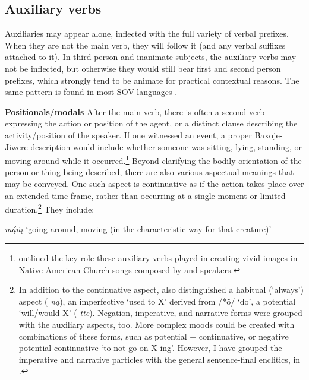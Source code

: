 \documentclass[output=paper]{LSP/langsci}
\begin{document}
\subsection{Auxiliary verbs}
Auxiliaries may appear alone, inflected with the full variety of verbal prefixes. When they are not the main verb, they will follow it (and any verbal suffixes attached to it).  In third person and inanimate subjects, the auxiliary verbs may not be inflected, but otherwise they would still bear first and second person prefixes, which strongly tend to be animate for practical contextual reasons.  The same pattern is found in most SOV languages \citep[490]{Rankin2005b}.  

\vspace{1em}
\textbf{Positionals/modals}  After the main verb, there is often a second verb expressing the action or position of the agent, or a distinct clause describing the activity/position of the speaker.  If one witnessed an event, a proper Baxoje-Jiwere description would include whether someone was sitting, lying, standing, or moving around while it occurred.\footnote{\citealt{Davidson1997} outlined the key role these auxiliary verbs played in creating vivid images in Native American Church songs composed by  and  speakers.}  Beyond clarifying the bodily orientation of the person or thing being described, there are also various aspectual meanings that may be conveyed.  One such aspect is continuative as if the action takes place over an extended time frame, rather than occurring at a single moment or limited duration.\footnote{In addition to the continuative aspect, \citet[484--485]{Rankin2005b} also distinguished a habitual (`always') aspect ( \textit{n\k{a}}), an imperfective `used to X' derived from  /*\~o/ `do', a potential `will/would X' ( \textit{tte}). Negation, imperative, and narrative forms were grouped with the auxiliary aspects, too. More complex moods could be created with combinations of these forms, such as potential + continuative, or negative potential continuative `to not go on X-ing'. However, I have grouped the imperative and narrative particles with the general sentence-final enclitics, in .} They include:

\hspace{2em} \textit{m\k{á}ñ\k{i}} `going around, moving (in the characteristic way for that creature)'
	
\end{document}
